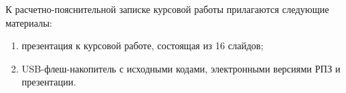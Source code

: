 
К расчетно-пояснительной записке курсовой работы прилагаются следующие материалы:
\begin{enumerate}
	\item презентация к курсовой работе, состоящая из 16 слайдов;
	\item USB-флеш-накопитель с исходными кодами, электронными версиями РПЗ и презентации.
\end{enumerate}
